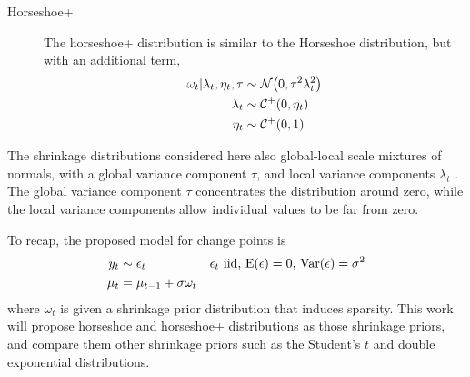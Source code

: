 \begin{description}
\item[Horseshoe+] The horseshoe+ distribution \textcite{BhadraDattaPolsonEtAl2015a} is similar to the Horseshoe distribution, but with an additional term,
\begin{equation}
  \label{dlm:eq:15}
  \begin{aligned}[t]
    \omega_{t} | \lambda_{t}, \eta_{t}, \tau & \sim \mathcal{N}\mathopen{}\left(0, \tau^{2} \lambda_{t}^{2}\right)\mathclose{} \\
    \lambda_{t}  & \sim \mathcal{C^+}\mathopen{}\left(0, \eta_{t}\right)\mathclose{} \\
    \eta_{t} & \sim \mathcal{C^+}\mathopen{}\left(0, 1\right)\mathclose{} 
  \end{aligned}
\end{equation}
\end{description}

The shrinkage distributions considered here also global-local scale mixtures of normals, with a global variance component $\tau$, and local variance components $\lambda_{t}$ \parencite{PolsonScott2010}.
The global variance component $\tau$ concentrates the distribution around zero, while the local variance components allow individual values to be far from zero.

To recap, the proposed model for change points is
\begin{align}
  \label{dlm:eq:16}
  y_{t} & \sim \epsilon_{t} & \text{$\epsilon_{t}$ iid, $\operatorname{E}(\epsilon) = 0$, $\operatorname{Var}(\epsilon) = \sigma^{2}$} \\
  \mu_{t} &= \mu_{t - 1} + \sigma \omega_{t}
\end{align}
where $\omega_{t}$ is given a shrinkage prior distribution that induces sparsity.
This work will propose horseshoe and horseshoe+ distributions as those shrinkage priors, and compare them other shrinkage priors such as the Student's $t$ and double exponential distributions.

